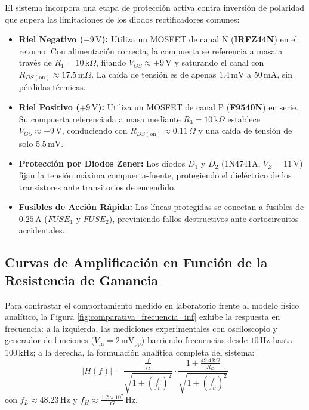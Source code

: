 \documentclass[11pt,a4paper]{article}
\begin{document}
El sistema incorpora una etapa de protección activa contra inversión de polaridad que supera las limitaciones de los diodos rectificadores comunes:
\begin{itemize}
    \item \textbf{Riel Negativo ($-9\,\text{V}$):} Utiliza un MOSFET de canal N (\textbf{IRFZ44N}) en el retorno. Con alimentación correcta, la compuerta se referencia a masa a través de $R_1 = 10\,\text{k}\Omega$, fijando $V_{GS} \approx +9\,\text{V}$ y saturando el canal con $R_{DS(\text{on})} \approx 17.5\,\text{m}\Omega$. La caída de tensión es de apenas $1.4\,\text{mV}$ a $50\,\text{mA}$, sin pérdidas térmicas.
    \item \textbf{Riel Positivo ($+9\,\text{V}$):} Utiliza un MOSFET de canal P (\textbf{F9540N}) en serie. Su compuerta referenciada a masa mediante $R_3 = 10\,\text{k}\Omega$ establece $V_{GS} \approx -9\,\text{V}$, conduciendo con $R_{DS(\text{on})} \approx 0.11\,\Omega$ y una caída de tensión de solo $5.5\,\text{mV}$.
    \item \textbf{Protección por Diodos Zener:} Los diodos $D_1$ y $D_2$ (1N4741A, $V_Z = 11\,\text{V}$) fijan la tensión máxima compuerta-fuente, protegiendo el dieléctrico de los transistores ante transitorios de encendido.
    \item \textbf{Fusibles de Acción Rápida:} Las líneas protegidas se conectan a fusibles de $0.25\,\text{A}$ ($FUSE_1$ y $FUSE_2$), previniendo fallos destructivos ante cortocircuitos accidentales.
\end{itemize}

\subsection{Curvas de Amplificación en Función de la Resistencia de Ganancia}
Para contrastar el comportamiento medido en laboratorio frente al modelo físico analítico, la Figura \ref{fig:comparativa_frecuencia_inf} exhibe la respuesta en frecuencia: a la izquierda, las mediciones experimentales con osciloscopio y generador de funciones ($V_{\text{in}} = 2\,\text{mV}_{\text{pp}}$) barriendo frecuencias desde $10\,\text{Hz}$ hasta $100\,\text{kHz}$; a la derecha, la formulación analítica completa del sistema:
\begin{equation}
|H(f)| = \frac{\frac{f}{f_L}}{\sqrt{1 + \left(\frac{f}{f_L}\right)^2}} \cdot \frac{1 + \frac{49.4\,\text{k}\Omega}{R_G}}{\sqrt{1 + \left(\frac{f}{f_H}\right)^2}}
\end{equation}
con $f_L \approx 48.23\,\text{Hz}$ y $f_H \approx \frac{1.2 \times 10^7}{G}\,\text{Hz}$.
\end{document}
